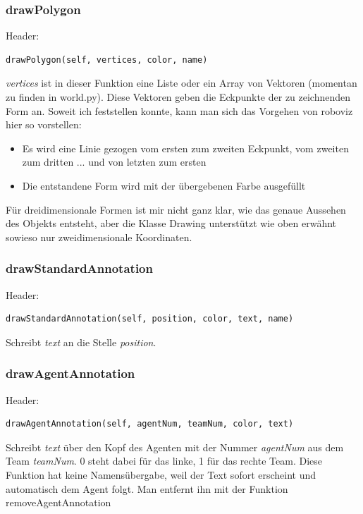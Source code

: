 \subsubsection{drawPolygon}
Header:

\begin{verbatim}drawPolygon(self, vertices, color, name)
\end{verbatim}
\textit{vertices} ist in dieser Funktion eine Liste oder ein Array von 
Vektoren (momentan zu finden in world.py). Diese Vektoren geben die 
Eckpunkte der zu zeichnenden Form an. Soweit ich feststellen konnte, kann
 man sich das Vorgehen von roboviz hier so vorstellen:

\begin{itemize}
\item Es wird eine Linie gezogen vom ersten zum zweiten Eckpunkt, vom zweiten zum dritten ... und von letzten zum ersten
\item Die entstandene Form wird mit der übergebenen Farbe ausgefüllt
\end{itemize}
Für dreidimensionale Formen ist mir nicht ganz klar, wie das genaue 
Aussehen des Objekts entsteht, aber die Klasse Drawing unterstützt wie 
oben erwähnt sowieso nur zweidimensionale Koordinaten.

\subsubsection{drawStandardAnnotation}
Header:

\begin{verbatim}drawStandardAnnotation(self, position, color, text, name)
\end{verbatim}
Schreibt \textit{text} an die Stelle \textit{position}.

\subsubsection{drawAgentAnnotation}
Header:

\begin{verbatim}drawAgentAnnotation(self, agentNum, teamNum, color, text)
\end{verbatim}
Schreibt \textit{text} über den Kopf des Agenten mit der Nummer \textit{agentNum} aus dem Team \textit{teamNum}.
0 steht dabei für das linke, 1 für das rechte Team.
Diese Funktion hat keine Namensübergabe, weil der Text sofort erscheint und automatisch dem Agent folgt.
Man entfernt ihn mit der Funktion removeAgentAnnotation

